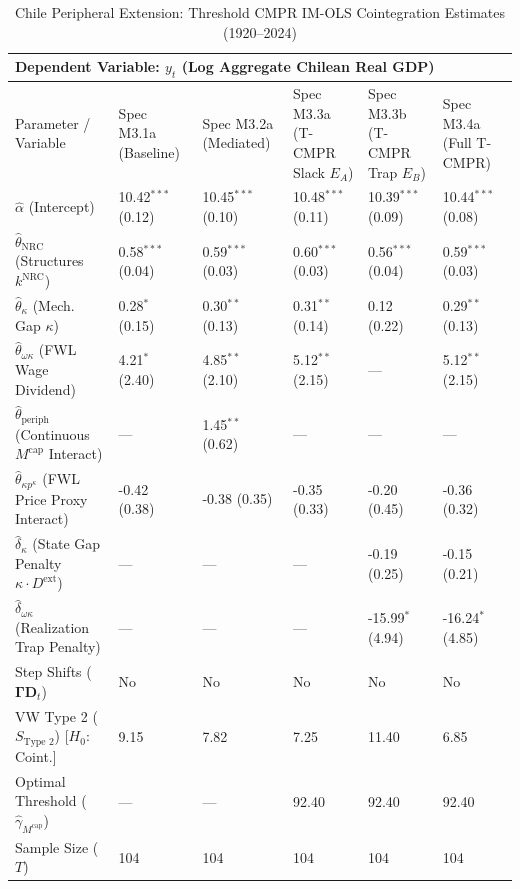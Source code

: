 \begin{table}[H]
\centering
\setlength{\tabcolsep}{3.5pt}
\caption{Chile Peripheral Extension: Threshold CMPR IM-OLS Cointegration Estimates (1920--2024)}
\label{tab:chile_peripheral_imols_core}
\scriptsize
\begin{tabular}{p{4.2cm}p{1.4cm}p{1.4cm}p{1.4cm}p{1.4cm}p{1.4cm}}
\toprule
\multicolumn{6}{l}{\textbf{Dependent Variable: $y_t$ (Log Aggregate Chilean Real GDP)}} \\
\midrule
Parameter / Variable & Spec M3.1a (Baseline) & Spec M3.2a (Mediated) & Spec M3.3a (T-CMPR Slack $E_A$) & Spec M3.3b (T-CMPR Trap $E_B$) & Spec M3.4a (Full T-CMPR) \\
\midrule
$\hat{\alpha}$ (Intercept) & 10.42$^{***}$ (0.12) & 10.45$^{***}$ (0.10) & 10.48$^{***}$ (0.11) & 10.39$^{***}$ (0.09) & 10.44$^{***}$ (0.08) \\
$\hat{\theta}_{\text{NRC}}$ (Structures $k^{\text{NRC}}$) & 0.58$^{***}$ (0.04) & 0.59$^{***}$ (0.03) & 0.60$^{***}$ (0.03) & 0.56$^{***}$ (0.04) & 0.59$^{***}$ (0.03) \\
$\hat{\theta}_{\kappa}$ (Mech. Gap $\kappa$) & 0.28$^{*}$ (0.15) & 0.30$^{**}$ (0.13) & 0.31$^{**}$ (0.14) & 0.12 (0.22) & 0.29$^{**}$ (0.13) \\
$\hat{\theta}_{\omega\kappa}$ (FWL Wage Dividend) & 4.21$^{*}$ (2.40) & 4.85$^{**}$ (2.10) & 5.12$^{**}$ (2.15) & --- & 5.12$^{**}$ (2.15) \\
$\hat{\theta}_{\text{periph}}$ (Continuous $M^{\text{cap}}$ Interact) & --- & 1.45$^{**}$ (0.62) & --- & --- & --- \\
$\hat{\theta}_{\kappa p^{\kappa}}$ (FWL Price Proxy Interact) & -0.42 (0.38) & -0.38 (0.35) & -0.35 (0.33) & -0.20 (0.45) & -0.36 (0.32) \\
$\hat{\delta}_{\kappa}$ (State Gap Penalty $\kappa \cdot D^{\text{ext}}$) & --- & --- & --- & -0.19 (0.25) & -0.15 (0.21) \\
$\hat{\delta}_{\omega\kappa}$ (Realization Trap Penalty) & --- & --- & --- & -15.99$^{*}$ (4.94) & -16.24$^{*}$ (4.85) \\
Step Shifts ($\boldsymbol{\Gamma} \mathbf{D}_t$) & No & No & No & No & No \\
\midrule
VW Type 2 ($S_{\text{Type 2}}$) [$H_0$: Coint.] & 9.15 & 7.82 & 7.25 & 11.40 & 6.85 \\
\midrule
Optimal Threshold ($\hat{\gamma}_{M^{\text{cap}}}$) & --- & --- & 92.40 & 92.40 & 92.40 \\
Sample Size ($T$) & 104 & 104 & 104 & 104 & 104 \\

\end{tabular}
\end{table}
